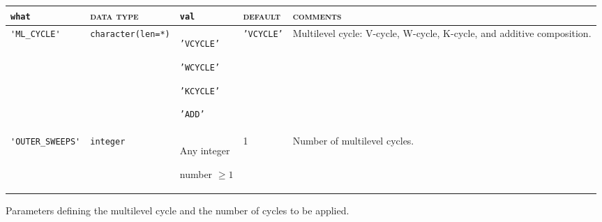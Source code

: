 \bsideways
\begin{center}
\begin{tabular}{|p{3.6cm}|l|p{2.4cm}|p{2.4cm}|p{7.2cm}|}
\hline
\verb|what|              & \textsc{data type}        &  \verb|val|      &  \textsc{default}  &
\textsc{comments} \\ \hline
\verb|'ML_CYCLE'|     & \verb|character(len=*)|
                         & \texttt{'VCYCLE'} \par \texttt{'WCYCLE'}   \par \texttt{'KCYCLE'} \par \texttt{'ADD'}
                         & \texttt{'VCYCLE'}
                         &Multilevel cycle: V-cycle, W-cycle, K-cycle, and additive composition. \\ \hline
 \verb|'OUTER_SWEEPS'| & \texttt{integer} &
                           Any integer \par number $\ge 1$  & 1 &
                           Number of multilevel cycles. \\ \hline

\end{tabular}
\end{center}
\caption{Parameters defining the multilevel cycle and the number of cycles to
be applied.
\label{tab:p_cycle}}
\esideways

